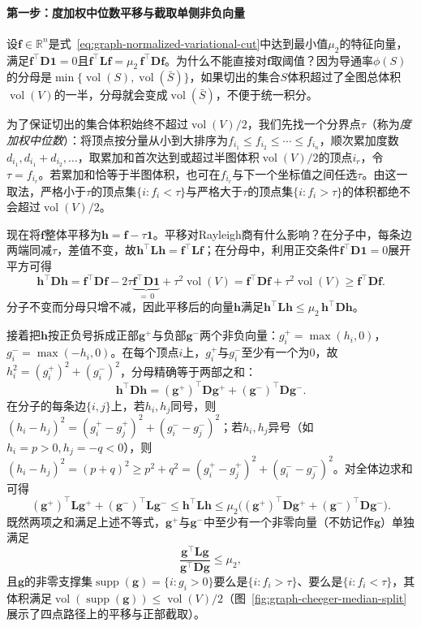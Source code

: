 \paragraph{第一步：度加权中位数平移与截取单侧非负向量}

设$\bm f\in\mathbb R^n$是式~\eqref{eq:graph-normalized-variational-cut}中达到最小值$\mu_2$的特征向量，满足$\bm f^\top\bm D\bm 1=0$且$\bm f^\top\bm L\bm f=\mu_2\,\bm f^\top\bm D\bm f$。为什么不能直接对$\bm f$取阈值？因为导通率$\phi(S)$的分母是$\min\{\operatorname{vol}(S),\operatorname{vol}(\bar S)\}$，如果切出的集合$S$体积超过了全图总体积$\operatorname{vol}(V)$的一半，分母就会变成$\operatorname{vol}(\bar S)$，不便于统一积分。

为了保证切出的集合体积始终不超过$\operatorname{vol}(V)/2$，我们先找一个分界点$\tau$（称为\emph{度加权中位数}）：将顶点按分量从小到大排序为$f_{i_1}\leq f_{i_2}\leq\cdots\leq f_{i_n}$，顺次累加度数$d_{i_1},d_{i_1}+d_{i_2},\ldots$，取累加和首次达到或超过半图体积$\operatorname{vol}(V)/2$的顶点$i_r$，令$\tau=f_{i_r}$。若累加和恰等于半图体积，也可在$f_{i_r}$与下一个坐标值之间任选$\tau$。由这一取法，严格小于$\tau$的顶点集$\{i:f_i<\tau\}$与严格大于$\tau$的顶点集$\{i:f_i>\tau\}$的体积都绝不会超过$\operatorname{vol}(V)/2$。

现在将$\bm f$整体平移为$\bm h=\bm f-\tau\bm 1$。平移对Rayleigh商有什么影响？在分子中，每条边两端同减$\tau$，差值不变，故$\bm h^\top\bm L\bm h=\bm f^\top\bm L\bm f$；在分母中，利用正交条件$\bm f^\top\bm D\bm 1=0$展开平方可得
\[
\bm h^\top\bm D\bm h
=\bm f^\top\bm D\bm f
-2\tau\underbrace{\bm f^\top\bm D\bm 1}_{=\,0}
+\tau^2\operatorname{vol}(V)
=\bm f^\top\bm D\bm f+\tau^2\operatorname{vol}(V)\geq \bm f^\top\bm D\bm f.
\]
分子不变而分母只增不减，因此平移后的向量$\bm h$满足$\bm h^\top\bm L\bm h\leq\mu_2\,\bm h^\top\bm D\bm h$。

接着把$\bm h$按正负号拆成正部$\bm g^+$与负部$\bm g^-$两个非负向量：$g^+_i=\max(h_i,0)$，$g^-_i=\max(-h_i,0)$。在每个顶点$i$上，$g^+_i$与$g^-_i$至少有一个为$0$，故$h_i^2=(g^+_i)^2+(g^-_i)^2$，分母精确等于两部之和：
\[
  \bm h^\top\bm D\bm h=(\bm g^+)^\top\bm D\bm g^+ + (\bm g^-)^\top\bm D\bm g^-.
\]
在分子的每条边$\{i,j\}$上，若$h_i,h_j$同号，则$(h_i-h_j)^2=(g^+_i-g^+_j)^2+(g^-_i-g^-_j)^2$；若$h_i,h_j$异号（如$h_i=p>0,h_j=-q<0$），则$(h_i-h_j)^2=(p+q)^2\geq p^2+q^2=(g^+_i-g^+_j)^2+(g^-_i-g^-_j)^2$。对全体边求和可得
\[
  (\bm g^+)^\top\bm L\bm g^+ + (\bm g^-)^\top\bm L\bm g^-\leq\bm h^\top\bm L\bm h\leq\mu_2\bigl((\bm g^+)^\top\bm D\bm g^+ + (\bm g^-)^\top\bm D\bm g^-\bigr).
\]
既然两项之和满足上述不等式，$\bm g^+$与$\bm g^-$中至少有一个非零向量（不妨记作$\bm g$）单独满足
\begin{equation}
\label{eq:cheeger-g-rayleigh}
  \frac{\bm g^\top\bm L\bm g}{\bm g^\top\bm D\bm g}\leq\mu_2,
\end{equation}
且$\bm g$的非零支撑集$\operatorname{supp}(\bm g)=\{i:g_i>0\}$要么是$\{i:f_i>\tau\}$、要么是$\{i:f_i<\tau\}$，其体积满足$\operatorname{vol}(\operatorname{supp}(\bm g))\leq\operatorname{vol}(V)/2$（图~\ref{fig:graph-cheeger-median-split}展示了四点路径上的平移与正部截取）。


